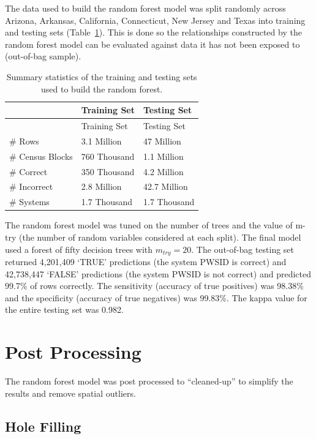 \documentclass[
  letterpaper,
  DIV=11,
  numbers=noendperiod,
  oneside]{scrartcl}
\begin{document}
The data used to build the random forest model was split randomly across
Arizona, Arkansas, California, Connecticut, New Jersey and Texas into
training and testing sets (Table~\ref{tbl-train}). This is done so the
relationships constructed by the random forest model can be evaluated
against data it has not been exposed to (out-of-bag sample).

\begin{longtable}[]{@{}lll@{}}
\caption{Summary statistics of the training and testing sets used to
build the random forest.}\label{tbl-train}\tabularnewline
\toprule\noalign{}
& Training Set & Testing Set \\
\midrule\noalign{}
\endfirsthead
\toprule\noalign{}
& Training Set & Testing Set \\
\midrule\noalign{}
\endhead
\bottomrule\noalign{}
\endlastfoot
\# Rows & 3.1 Million & 47 Million \\
\# Census Blocks & 760 Thousand & 1.1 Million \\
\# Correct & 350 Thousand & 4.2 Million \\
\# Incorrect & 2.8 Million & 42.7 Million \\
\# Systems & 1.7 Thousand & 1.7 Thousand \\
\end{longtable}

The random forest model was tuned on the number of trees and the value
of m-try (the number of random variables considered at each split). The
final model used a forest of fifty decision trees with \(m_{try}=20\).
The out-of-bag testing set returned 4,201,409 `TRUE' predictions (the
system PWSID is correct) and 42,738,447 `FALSE' predictions (the system
PWSID is not correct) and predicted 99.7\% of rows correctly. The
sensitivity (accuracy of true positives) was 98.38\% and the specificity
(accuracy of true negatives) was 99.83\%. The kappa value for the entire
testing set was 0.982.

\section{Post Processing}\label{post-processing}

The random forest model was post processed to ``cleaned-up'' to simplify
the results and remove spatial outliers.

\subsection{Hole Filling}\label{hole-filling}
\end{document}
